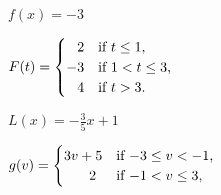 \begin{exenum}
\begin{enumerate}
\begin{multicols}{2}
 \end{multicols}

\end{enumerate}

\end{exenum}

\begin{shortexenum}

\setcounter{enumi}{\value{HW}}

\item $f(x) = -3$  

\item $F(t) = \begin{cases}
  \hphantom{\text{$-$}}2 &  \text{if $t \leq 1$, } \\
  -3  & \text{if $1 < t \leq 3$,} \\
  \hphantom{\text{$-$}}4 & \text{if $t>3$.} \\
 \end{cases}$

\setcounter{HW}{\value{enumi}}


\item $L(x) = -\frac{3}{5} x + 1$ 

\item $g(v) = \begin{cases}
   3v+5 &  \text{if $-3 \leq v < -1$, } \\
  \hphantom{\text{$3v+$}}2  & \text{if $-1 <  v \leq 3$,} \\
    \end{cases}$

\end{shortexenum}

